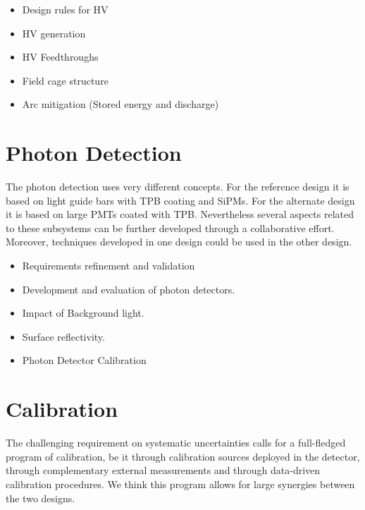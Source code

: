 \begin{itemize}

\item Design	
  rules	
  for	
  HV	
  
\item HV generation
  
\item HV Feedthroughs

\item Field cage structure

\item Arc	
  mitigation	
  (Stored	
  energy	
  and	
  discharge)	
  

\end{itemize}


 
\section{Photon Detection}

The photon detection uses very different concepts. For the reference design it is based on light guide bars with TPB coating and SiPMs. 
For the alternate design it is based on large PMTs coated with TPB. Nevertheless several aspects related to these subsystems can be further developed through a collaborative effort.
Moreover, techniques developed in one design could be used in the other design. 

\begin{itemize}

\item Requirements refinement and validation	
  
\item Development and evaluation	  of	  photon	 detectors.	
  
\item Impact of  Background  light.	
    
\item  Surface reflectivity.	
  
\item Photon	 Detector  Calibration	

\end{itemize}




\section{Calibration}

The challenging requirement on systematic uncertainties calls for a full-fledged program of calibration, be it through calibration sources deployed in the detector, through complementary external measurements and through data-driven calibration procedures. We think this program allows for large synergies between the two designs. 

